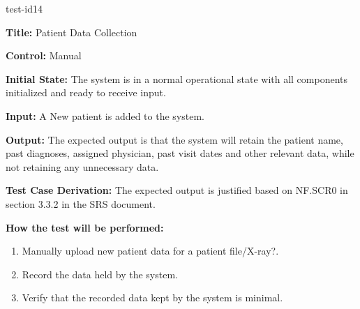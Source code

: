 \documentclass[12pt, titlepage]{article}
\begin{document}
\begin{itemize}
    \begin{item}
        test-id14
        \begin{mdframed}[linewidth=0.5mm]
            \textbf{Title:} Patient Data Collection \par
            \textbf{Control:} Manual \par
            \textbf{Initial State:} The system is in a normal operational state with all components initialized and ready to receive input. \par
            \textbf{Input:} A New patient is added to the system. \par
            \textbf{Output:} The expected output is that the system will retain the patient name, past diagnoses, assigned physician, past visit dates and other relevant data, while not retaining any unnecessary data. \par
            \textbf{Test Case Derivation:} The expected output is justified based on NF.SCR0 in section 3.3.2 in the SRS document. \par
            \textbf{How the test will be performed:}
            \begin{enumerate}[noitemsep]
                \item Manually upload new patient data for a patient file/X-ray?.
                \item Record the data held by the system.
                \item Verify that the recorded data kept by the system is minimal.
            \end{enumerate}
        \end{mdframed}
    \end{item}


\end{itemize}
\end{document}
